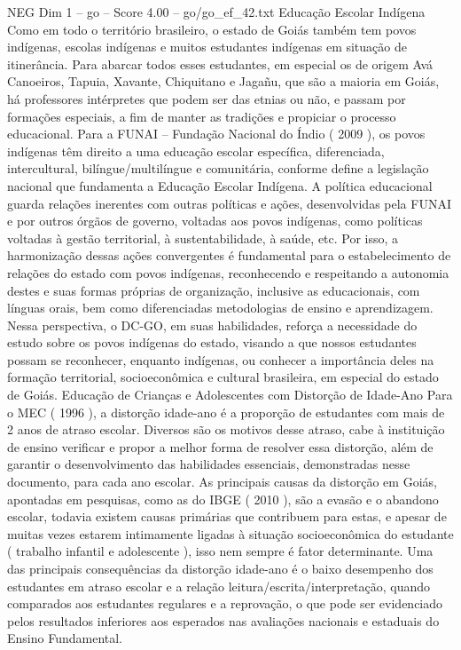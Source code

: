 \begin{textsample}{NEG Dim 1 – go – Score 4.00 – go/go\_ef\_42.txt}  \label{ex:f1_neg_197}
Educação Escolar Indígena Como em todo o território brasileiro, o estado de Goiás também tem povos indígenas, escolas indígenas e muitos estudantes indígenas em situação de itinerância.
Para abarcar todos esses estudantes, em especial os de origem Avá Canoeiros, Tapuia, Xavante, Chiquitano e Jagañu, que são a maioria em Goiás, há professores intérpretes que podem ser das etnias ou não, e passam por formações especiais, a fim de manter as tradições e propiciar o processo educacional.
Para a FUNAI – Fundação Nacional do Índio ( 2009 ), os povos indígenas têm direito a uma educação escolar específica, diferenciada, intercultural, bilíngue/multilíngue e comunitária, conforme define a legislação nacional que fundamenta a Educação Escolar Indígena.
A política educacional guarda relações inerentes com outras políticas e ações, desenvolvidas pela FUNAI e por outros órgãos de governo, voltadas aos povos indígenas, como políticas voltadas à gestão territorial, à sustentabilidade, à saúde, etc.
Por isso, a harmonização dessas ações convergentes é fundamental para o estabelecimento de relações do estado com povos indígenas, reconhecendo e respeitando a autonomia destes e suas formas próprias de organização, inclusive as educacionais, com línguas orais, bem como diferenciadas metodologias de ensino e aprendizagem.
Nessa perspectiva, o DC-GO, em suas habilidades, reforça a necessidade do estudo sobre os povos indígenas do estado, visando a que nossos estudantes possam se reconhecer, enquanto indígenas, ou conhecer a importância deles na formação territorial, socioeconômica e cultural brasileira, em especial do estado de Goiás.
Educação de Crianças e Adolescentes com Distorção de Idade-Ano Para o MEC ( 1996 ), a distorção idade-ano é a proporção de estudantes com mais de 2 anos de atraso escolar.
Diversos são os motivos desse atraso, cabe à instituição de ensino verificar e propor a melhor forma de resolver essa distorção, além de garantir o desenvolvimento das habilidades essenciais, demonstradas nesse documento, para cada ano escolar.
As principais causas da distorção em Goiás, apontadas em pesquisas, como as do IBGE ( 2010 ), são a evasão e o abandono escolar, todavia existem causas primárias que contribuem para estas, e apesar de muitas vezes estarem intimamente ligadas à situação socioeconômica do estudante ( trabalho infantil e adolescente ), isso nem sempre é fator determinante.
Uma das principais consequências da distorção idade-ano é o baixo desempenho dos estudantes em atraso escolar e a relação leitura/escrita/interpretação, quando comparados aos estudantes regulares e a reprovação, o que pode ser evidenciado pelos resultados inferiores aos esperados nas avaliações nacionais e estaduais do Ensino Fundamental.

\end{textsample}
